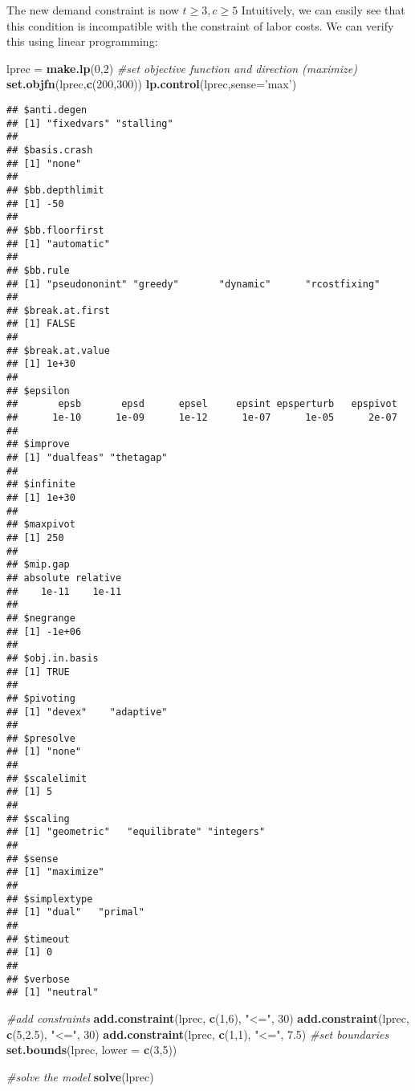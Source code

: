 \documentclass[]{article}
\newenvironment{Shaded}{\begin{snugshade}}{\end{snugshade}}
\newcommand{\KeywordTok}[1]{\textcolor[rgb]{0.13,0.29,0.53}{\textbf{#1}}}
\newcommand{\DataTypeTok}[1]{\textcolor[rgb]{0.13,0.29,0.53}{#1}}
\newcommand{\DecValTok}[1]{\textcolor[rgb]{0.00,0.00,0.81}{#1}}
\newcommand{\FloatTok}[1]{\textcolor[rgb]{0.00,0.00,0.81}{#1}}
\newcommand{\StringTok}[1]{\textcolor[rgb]{0.31,0.60,0.02}{#1}}
\newcommand{\CommentTok}[1]{\textcolor[rgb]{0.56,0.35,0.01}{\textit{#1}}}
\newcommand{\NormalTok}[1]{#1}
\begin{document}
The new demand constraint is now \(t \geq 3, c \geq 5\) Intuitively, we
can easily see that this condition is incompatible with the constraint
of labor costs. We can verify this using linear programming:

\begin{Shaded}
\begin{Highlighting}[]
\NormalTok{lprec =}\StringTok{ }\KeywordTok{make.lp}\NormalTok{(}\DecValTok{0}\NormalTok{,}\DecValTok{2}\NormalTok{)}
\CommentTok{#set objective function and direction (maximize)}
\KeywordTok{set.objfn}\NormalTok{(lprec,}\KeywordTok{c}\NormalTok{(}\DecValTok{200}\NormalTok{,}\DecValTok{300}\NormalTok{))}
\KeywordTok{lp.control}\NormalTok{(lprec,}\DataTypeTok{sense=}\StringTok{'max'}\NormalTok{)}
\end{Highlighting}
\end{Shaded}

\begin{verbatim}
## $anti.degen
## [1] "fixedvars" "stalling" 
## 
## $basis.crash
## [1] "none"
## 
## $bb.depthlimit
## [1] -50
## 
## $bb.floorfirst
## [1] "automatic"
## 
## $bb.rule
## [1] "pseudononint" "greedy"       "dynamic"      "rcostfixing" 
## 
## $break.at.first
## [1] FALSE
## 
## $break.at.value
## [1] 1e+30
## 
## $epsilon
##       epsb       epsd      epsel     epsint epsperturb   epspivot 
##      1e-10      1e-09      1e-12      1e-07      1e-05      2e-07 
## 
## $improve
## [1] "dualfeas" "thetagap"
## 
## $infinite
## [1] 1e+30
## 
## $maxpivot
## [1] 250
## 
## $mip.gap
## absolute relative 
##    1e-11    1e-11 
## 
## $negrange
## [1] -1e+06
## 
## $obj.in.basis
## [1] TRUE
## 
## $pivoting
## [1] "devex"    "adaptive"
## 
## $presolve
## [1] "none"
## 
## $scalelimit
## [1] 5
## 
## $scaling
## [1] "geometric"   "equilibrate" "integers"   
## 
## $sense
## [1] "maximize"
## 
## $simplextype
## [1] "dual"   "primal"
## 
## $timeout
## [1] 0
## 
## $verbose
## [1] "neutral"
\end{verbatim}

\begin{Shaded}
\begin{Highlighting}[]
\CommentTok{#add constraints}
\KeywordTok{add.constraint}\NormalTok{(lprec, }\KeywordTok{c}\NormalTok{(}\DecValTok{1}\NormalTok{,}\DecValTok{6}\NormalTok{), }\StringTok{"<="}\NormalTok{, }\DecValTok{30}\NormalTok{)}
\KeywordTok{add.constraint}\NormalTok{(lprec, }\KeywordTok{c}\NormalTok{(}\DecValTok{5}\NormalTok{,}\FloatTok{2.5}\NormalTok{), }\StringTok{"<="}\NormalTok{, }\DecValTok{30}\NormalTok{)}
\KeywordTok{add.constraint}\NormalTok{(lprec, }\KeywordTok{c}\NormalTok{(}\DecValTok{1}\NormalTok{,}\DecValTok{1}\NormalTok{), }\StringTok{"<="}\NormalTok{, }\FloatTok{7.5}\NormalTok{)}
\CommentTok{#set boundaries}
\KeywordTok{set.bounds}\NormalTok{(lprec, }\DataTypeTok{lower =} \KeywordTok{c}\NormalTok{(}\DecValTok{3}\NormalTok{,}\DecValTok{5}\NormalTok{))}

\CommentTok{#solve the model}
\KeywordTok{solve}\NormalTok{(lprec)}
\end{Highlighting}
\end{Shaded}
\end{document}
